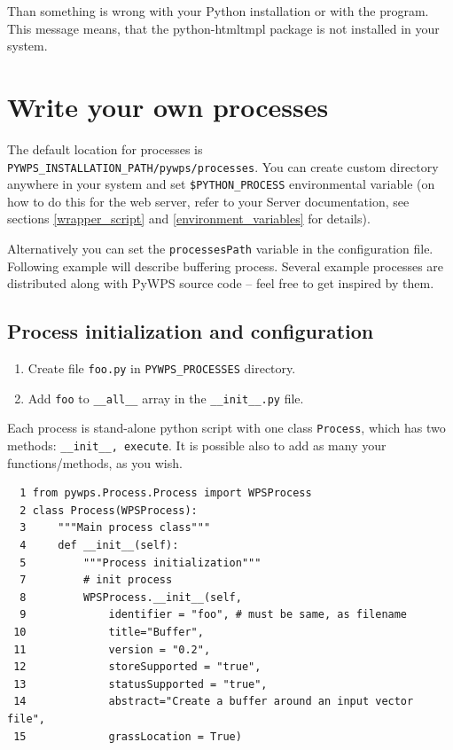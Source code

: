 \documentclass[a4paper,11pt]{report}
\begin{document}
     
Than something is wrong with your Python installation or with the program.
This message means, that the python-htmltmpl package is not installed in
your system.
     
\chapter{Write your own processes}
\label{processes}
    
The default location for processes is \texttt{PYWPS\_INSTALLATION\_PATH/pywps/processes}. You can
create custom directory anywhere in your system and set
\texttt{\$PYTHON\_PROCESS} environmental variable (on how to do this for the web
server, refer to your Server documentation, see sections
\ref{wrapper_script} and \ref{environment_variables} for details).

Alternatively you can set the \texttt{processesPath} variable in the configuration file.
Following example will describe buffering process. Several example processes are 
distributed along with PyWPS source code -- feel free to get inspired by
them.

\section{Process initialization and configuration}
\begin{enumerate}
\item Create file \texttt{foo.py} in \texttt{PYWPS\_PROCESSES} directory.
\item Add \texttt{foo} to \texttt{\_\_all\_\_} array in the \texttt{\_\_init\_\_.py}
file.
\end{enumerate}
    
Each process is stand-alone python script with one class \texttt{Process},
which has two methods: \texttt{\_\_init\_\_, execute}. It is possible also to add as 
many your functions/methods, as you wish.
    

\begin{verbatim}
  1 from pywps.Process.Process import WPSProcess                                
  2 class Process(WPSProcess):
  3     """Main process class"""
  4     def __init__(self):
  5         """Process initialization"""
  7         # init process
  8         WPSProcess.__init__(self,
  9             identifier = "foo", # must be same, as filename
 10             title="Buffer",
 11             version = "0.2",
 12             storeSupported = "true",
 13             statusSupported = "true",
 14             abstract="Create a buffer around an input vector file",
 15             grassLocation = True)
\end{verbatim}
\end{document}
